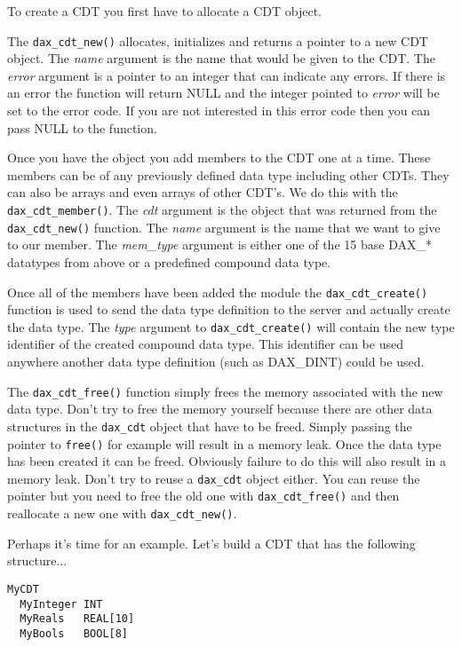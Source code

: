 To create a CDT you first have to allocate a CDT object.

The \verb|dax_cdt_new()| allocates, initializes and returns a pointer to a new CDT object.  The \textit{name} argument is the name that would be given to the CDT.  The \textit{error} argument is a pointer to an integer that can indicate any errors.  If there is an error the function will return NULL and the integer pointed to \textit{error} will be set to the error code.  If you are not interested in this error code then you can pass NULL to the function.

Once you have the object you add members to the CDT one at a time.  These members can be of any previously defined data type including other CDTs.  They can also be arrays and even arrays of other CDT's.  We do this with the \verb|dax_cdt_member()|.  The \textit{cdt} argument is the object that was returned from the \verb|dax_cdt_new()| function.  The \textit{name} argument is the name that we want to give to our member.  The \textit{mem\_type} argument is either one of the 15 base DAX\_* datatypes from above or a predefined compound data type.

Once all of the members have been added the module the \verb|dax_cdt_create()| function is used to send the data type definition to the server and actually create the data type.  The \textit{type} argument to \verb|dax_cdt_create()| will contain the new type identifier of the created compound data type.  This identifier can be used anywhere another data type definition (such as DAX\_DINT) could be used.

The \verb|dax_cdt_free()| function simply frees the memory associated with the new data type.  Don't try to free the memory yourself because there are other data structures in the \verb|dax_cdt| object that have to be freed.  Simply passing the pointer to \verb|free()| for example will result in a memory leak.  Once the data type has been created it can be freed.  Obviously failure to do this will also result in a memory leak.  Don't try to reuse a \verb|dax_cdt| object either.  You can reuse the pointer but you need to free the old one with \verb|dax_cdt_free()| and then reallocate a new one with \verb|dax_cdt_new()|.

Perhaps it's time for an example.  Let's build a CDT that has the following structure...

\begin{verbatim}
MyCDT
  MyInteger INT
  MyReals   REAL[10]
  MyBools   BOOL[8]
\end{verbatim}

